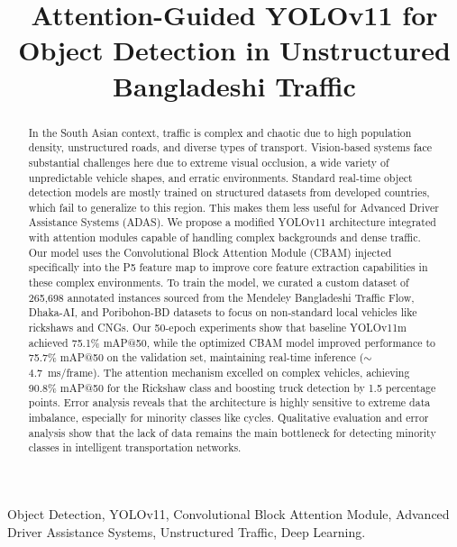 \documentclass[conference]{IEEEtran}
\begin{document}
\title{Attention-Guided YOLOv11 for Object Detection in Unstructured Bangladeshi Traffic}

\maketitle

\begin{abstract}
In the South Asian context, traffic is complex and chaotic due to high population density, unstructured roads, and diverse types of transport. Vision-based systems face substantial challenges here due to extreme visual occlusion, a wide variety of unpredictable vehicle shapes, and erratic environments. Standard real-time object detection models are mostly trained on structured datasets from developed countries, which fail to generalize to this region. This makes them less useful for Advanced Driver Assistance Systems (ADAS). We propose a modified YOLOv11 architecture integrated with attention modules capable of handling complex backgrounds and dense traffic. Our model uses the Convolutional Block Attention Module (CBAM) injected specifically into the P5 feature map to improve core feature extraction capabilities in these complex environments. To train the model, we curated a custom dataset of 265,698 annotated instances sourced from the Mendeley Bangladeshi Traffic Flow, Dhaka-AI, and Poribohon-BD datasets to focus on non-standard local vehicles like rickshaws and CNGs. Our 50-epoch experiments show that baseline YOLOv11m achieved 75.1\% mAP@50, while the optimized CBAM model improved performance to 75.7\% mAP@50 on the validation set, maintaining real-time inference ($\sim$4.7~ms/frame). The attention mechanism excelled on complex vehicles, achieving 90.8\% mAP@50 for the Rickshaw class and boosting truck detection by 1.5 percentage points. Error analysis reveals that the architecture is highly sensitive to extreme data imbalance, especially for minority classes like cycles. Qualitative evaluation and error analysis show that the lack of data remains the main bottleneck for detecting minority classes in intelligent transportation networks.
\end{abstract}

\begin{IEEEkeywords}
Object Detection, YOLOv11, Convolutional Block Attention Module, Advanced Driver Assistance Systems, Unstructured Traffic, Deep Learning.
\end{IEEEkeywords}
\end{document}
